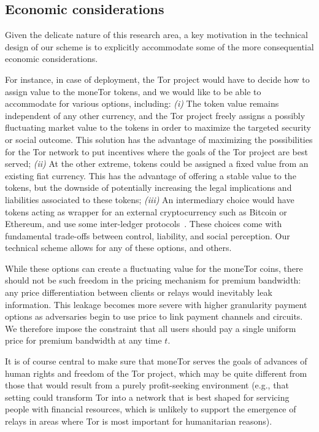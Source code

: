 \subsection{Economic considerations}

Given the delicate nature of this research area, a key motivation in the technical design of our scheme is to explicitly accommodate some of the more consequential economic considerations.

For instance, in case of deployment, the Tor project would have to decide how to assign value to the moneTor tokens, and we would like to be able to accommodate for various options, including: \emph{(i)} The token value remains independent of any other currency, and the Tor project freely assigns a possibly fluctuating market value to the tokens in order to maximize the targeted security or social outcome.
This solution has the advantage of maximizing the possibilities for the Tor network to put incentives where the goals of the Tor project are best served; \emph{(ii)} At the other extreme, tokens could be assigned a fixed value from an existing fiat currency.
This has the advantage of offering a stable value to the tokens, but the downside of potentially increasing the legal implications and liabilities associated to these tokens; \emph{(iii)} An intermediary choice would have tokens acting as wrapper for an external cryptocurrency such as Bitcoin or Ethereum, and use some inter-ledger protocols~\cite{back2014enabling,poon2017plasma}.
These choices come with fundamental trade-offs between control, liability, and social perception.
Our technical scheme allows for any of these options, and others.

While these options can create a fluctuating value for the moneTor coins, there should not be such freedom in the pricing mechanism for premium bandwidth: any price differentiation between clients or relays would inevitably leak information.
This leakage becomes more severe with higher granularity payment options as adversaries begin to use price to link payment channels and circuits.
We therefore impose the constraint that all users should pay a single uniform price for premium bandwidth at any time $t$.

It is of course central to make sure that moneTor serves the goals of advances of human rights and freedom of the Tor project, which may be quite different from those that would result from a purely profit-seeking environment (e.g., that setting could transform Tor into a network that is best shaped for servicing people with financial resources, which is unlikely to support the emergence of relays in areas where Tor is most important for humanitarian reasons).

